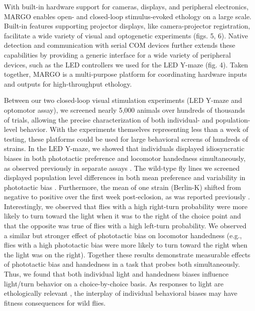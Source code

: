 \documentclass[12pt,letterpaper]{article}
\begin{document}
With built-in hardware support for cameras, displays, and peripheral electronics, MARGO enables open- and closed-loop stimulus-evoked ethology on a large scale. Built-in features supporting projector displays, like camera-projector registration, facilitate a wide variety of visual and optogenetic experiments (figs. 5, 6). Native detection and communication with serial COM devices further extends these capabilities by providing a generic interface for a wide variety of peripheral devices, such as the LED controllers we used for the LED Y-maze (fig. 4). Taken together, MARGO is a multi-purpose platform for coordinating hardware inputs and outputs for high-throughput ethology. 

Between our two closed-loop visual stimulation experiments (LED Y-maze and optomotor assay), we screened nearly 5,000 animals over hundreds of thousands of trials, allowing the precise characterization of both individual- and population-level behavior. With the experiments themselves representing less than a week of testing, these platforms could be used for large behavioral screens of hundreds of strains. In the LED Y-maze, we showed that individuals displayed idiosyncratic biases in both phototactic preference and locomotor handedness simultaneously, as observed previously in separate assays \cite{Kain_Phototactic_2012,Buchanan_Neuronal_2015}. The wild-type fly lines we screened displayed population level differences in both mean preference and variability in phototactic bias \cite{Ayroles_Behavioral_2015}. Furthermore, the mean of one strain (Berlin-K) shifted from negative to positive over the first week post-eclosion, as was reported previously \cite{Chiang_Tactic_1963}. Interestingly, we observed that flies with a high right-turn probability were more likely to turn toward the light when it was to the right of the choice point and that the opposite was true of flies with a high left-turn probability. We observed a similar but stronger effect of phototactic bias on locomotor handedness (e.g., flies with a high phototactic bias were more likely to turn toward the right when the light was on the right). Together these results demonstrate measurable effects of phototactic bias and handedness in a task that probes both simultaneously. Thus, we found that both individual light and handedness biases influence light/turn behavior on a choice-by-choice basis. As responses to light are ethologically relevant \cite{Kain_Variability_2015}, the interplay of individual behavioral biases may have fitness consequences for wild flies.
\end{document}
